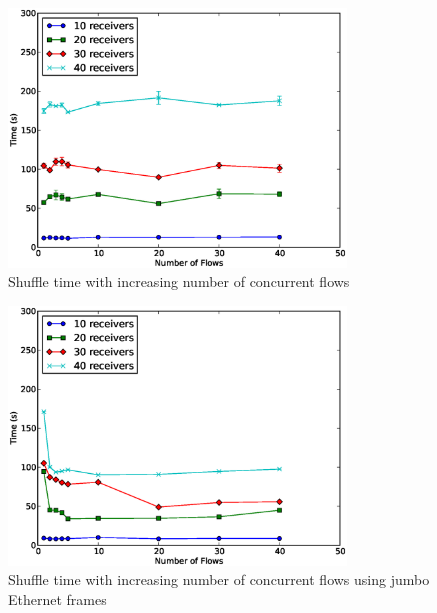 \documentclass[a4paper,12pt,twoside,openright]{report}
\begin{document}
\begin{figure}[h!]
  \centering
    \includegraphics[width=0.8\textwidth]{shuffle_flows.eps}
    \caption{Shuffle time with increasing number of concurrent flows}
    \label{chap:eval:sec:ciel:fig:shuffleflows}
\end{figure}

\begin{figure}[h!]
  \centering
    \includegraphics[width=0.8\textwidth]{shuffle_flows_jumbo.eps}
    \caption{Shuffle time with increasing number of concurrent flows using
    jumbo Ethernet frames}
    \label{chap:eval:sec:ciel:fig:shuffleflowsjumbo}
\end{figure}
\end{document}
